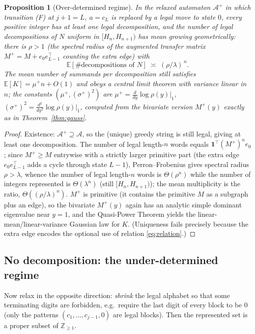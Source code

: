 \documentclass[12pt]{article}
\newtheorem{proposition}{Proposition}
\theoremstyle{definition}
\newcommand{\Z}{\mathbb{Z}}
\newcommand{\E}{\mathbb{E}}
\begin{document}
\begin{proposition}[Over-determined regime]\label{prop:multi}
In the relaxed automaton $\mathcal A^{+}$ in which transition (F) at
$j+1=L,\ a=c_L$ is replaced by a legal move to state $0$, every positive integer
has \emph{at least one} legal decomposition, and the number of legal
decompositions of $N$ uniform in $[H_n,H_{n+1})$ has mean growing geometrically:
there is $\rho>1$ (the spectral radius of the augmented transfer matrix
$M^{+}=M+e_0e_{L-1}^{\!\top}$ counting the extra edge) with
\[
\E[\#\text{decompositions of }N]\;\asymp\;(\rho/\lambda)^{\,n}.
\]
The mean number of summands per decomposition still satisfies
$\E[K]=\mu^{+}n+O(1)$ and obeys a central limit theorem with variance linear in
$n$; the constants $(\mu^{+},(\sigma^{+})^{2})$ are
$\mu^{+}=\frac{d}{dy}\log\rho(y)|_{1}$,
$(\sigma^{+})^{2}=\frac{d^2}{dy^2}\log\rho(y)|_{1}$, computed from the bivariate
version $M^{+}(y)$ exactly as in Theorem~\ref{thm:gauss}.
\end{proposition}

\begin{proof}
Existence: $\mathcal A^{+}\supseteq\mathcal A$, so the (unique) greedy string is
still legal, giving at least one decomposition. The number of legal length-$n$
words equals $\mathbf 1^{\!\top}(M^{+})^n e_0$; since $M^{+}\ge M$ entrywise with
a strictly larger primitive part (the extra edge $e_0e_{L-1}^{\!\top}$ adds a
cycle through state $L-1$), Perron--Frobenius gives spectral radius
$\rho>\lambda$, whence the number of legal length-$n$ words is $\Theta(\rho^n)$
while the number of integers represented is $\Theta(\lambda^n)$ (still
$[H_n,H_{n+1})$); the mean multiplicity is the ratio, $\Theta((\rho/\lambda)^n)$.
$M^{+}$ is primitive (it contains the primitive $M$ as a subgraph plus an edge),
so the bivariate $M^{+}(y)$ again has an analytic simple dominant eigenvalue
near $y=1$, and the Quasi-Power Theorem yields the linear-mean/linear-variance
Gaussian law for $K$. (Uniqueness fails precisely because the extra edge encodes
the optional use of relation \eqref{eq:relation}.)
\end{proof}

\subsection{No decomposition: the under-determined regime}
Now relax in the opposite direction: \emph{shrink} the legal alphabet so that
some terminating digits are forbidden, e.g.\ require the last digit of every
block to be $0$ (only the patterns $(c_1,\dots,c_{j-1},0)$ are legal blocks).
Then the represented set is a proper subset of $\Z_{\ge1}$.
\end{document}
